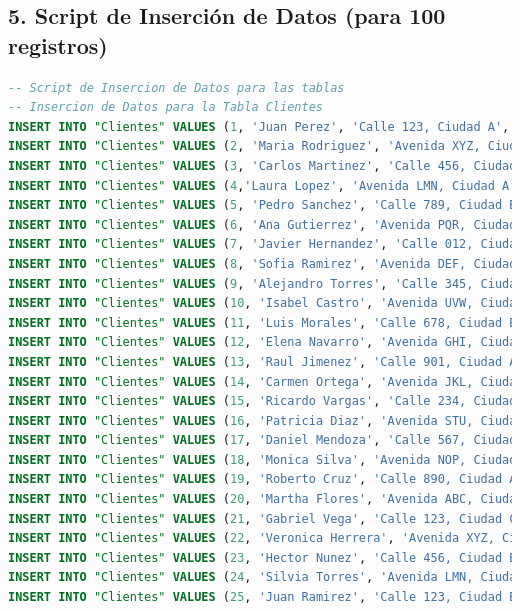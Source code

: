 \documentclass[12pt]{article}
\begin{document}
    \subsection*{5. Script de Inserción de Datos (para 100 registros)}
    \begin{lstlisting}[language=SQL]
-- Script de Insercion de Datos para las tablas 
-- Insercion de Datos para la Tabla Clientes
INSERT INTO "Clientes" VALUES (1, 'Juan Perez', 'Calle 123, Ciudad A', '555-1234');
INSERT INTO "Clientes" VALUES (2, 'Maria Rodriguez', 'Avenida XYZ, Ciudad B', '555-5678');
INSERT INTO "Clientes" VALUES (3, 'Carlos Martinez', 'Calle 456, Ciudad C', '555-9876');
INSERT INTO "Clientes" VALUES (4,'Laura Lopez', 'Avenida LMN, Ciudad A', '555-5432');
INSERT INTO "Clientes" VALUES (5, 'Pedro Sanchez', 'Calle 789, Ciudad B', '555-8765');
INSERT INTO "Clientes" VALUES (6, 'Ana Gutierrez', 'Avenida PQR, Ciudad C', '555-2345');
INSERT INTO "Clientes" VALUES (7, 'Javier Hernandez', 'Calle 012, Ciudad A', '555-6789');
INSERT INTO "Clientes" VALUES (8, 'Sofia Ramirez', 'Avenida DEF, Ciudad B', '555-3456');
INSERT INTO "Clientes" VALUES (9, 'Alejandro Torres', 'Calle 345, Ciudad C', '555-8765');
INSERT INTO "Clientes" VALUES (10, 'Isabel Castro', 'Avenida UVW, Ciudad A', '555-2345');
INSERT INTO "Clientes" VALUES (11, 'Luis Morales', 'Calle 678, Ciudad B', '555-7890');
INSERT INTO "Clientes" VALUES (12, 'Elena Navarro', 'Avenida GHI, Ciudad C', '555-4567');
INSERT INTO "Clientes" VALUES (13, 'Raul Jimenez', 'Calle 901, Ciudad A', '555-0987');
INSERT INTO "Clientes" VALUES (14, 'Carmen Ortega', 'Avenida JKL, Ciudad B', '555-6543');
INSERT INTO "Clientes" VALUES (15, 'Ricardo Vargas', 'Calle 234, Ciudad C', '555-5678');
INSERT INTO "Clientes" VALUES (16, 'Patricia Diaz', 'Avenida STU, Ciudad A', '555-4321');
INSERT INTO "Clientes" VALUES (17, 'Daniel Mendoza', 'Calle 567, Ciudad B', '555-8765');
INSERT INTO "Clientes" VALUES (18, 'Monica Silva', 'Avenida NOP, Ciudad C', '555-3210');
INSERT INTO "Clientes" VALUES (19, 'Roberto Cruz', 'Calle 890, Ciudad A', '555-7654');
INSERT INTO "Clientes" VALUES (20, 'Martha Flores', 'Avenida ABC, Ciudad B', '555-2109');
INSERT INTO "Clientes" VALUES (21, 'Gabriel Vega', 'Calle 123, Ciudad C', '555-6543');
INSERT INTO "Clientes" VALUES (22, 'Veronica Herrera', 'Avenida XYZ, Ciudad A', '555-0987');
INSERT INTO "Clientes" VALUES (23, 'Hector Nunez', 'Calle 456, Ciudad B', '555-5432');
INSERT INTO "Clientes" VALUES (24, 'Silvia Torres', 'Avenida LMN, Ciudad C', '555-8765');
INSERT INTO "Clientes" VALUES (25, 'Juan Ramirez', 'Calle 123, Ciudad B', '123-456-7890');

\end{lstlisting}
\end{document}
